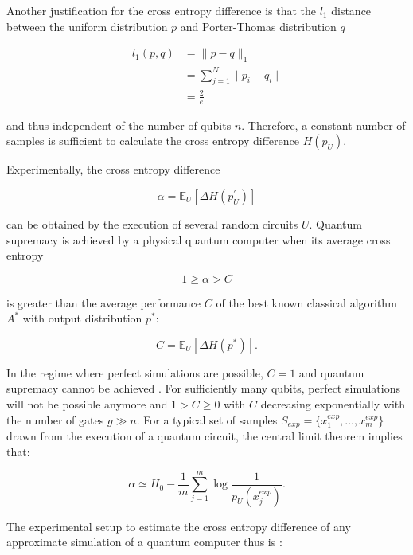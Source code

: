 Another justification for the cross entropy difference is that the $l_1$ distance between the uniform distribution $p$ and Porter-Thomas distribution $q$

\begin{align}
  l_1(p,q) &= \| p-q\|_1 \\
           &= \sum_{j=1}^N \mid p_i - q_i \mid \\
           &= \frac{2}{e}
\end{align}

and thus independent of the number of qubits $n$. Therefore, a
constant number of samples is sufficient to calculate the cross entropy difference $H(p_U)$.

Experimentally, the cross entropy difference

\begin{equation}
  \alpha = \mathbb{E}_U[\Delta H(p^{\prime}_U)]
\end{equation}

can be obtained by the execution of several random circuits $U$. Quantum
supremacy is achieved by a physical quantum computer when its average cross
entropy

\begin{equation}
  1 \geq \alpha > C
\end{equation}

is greater than the average performance $C$ of the best known classical algorithm $A^*$ with 
output distribution $p^*$:

\begin{equation}
  C = \mathbb{E}_U[\Delta H(p^*)] .
\end{equation}

In the regime where perfect simulations are possible, $C=1$ and quantum
supremacy cannot be achieved \cite{Boixo2018supremacy}. For sufficiently many qubits, perfect simulations
will not be possible anymore and $1 > C \geq 0$ with $C$ decreasing exponentially
with the number of gates $g\gg n$. For a typical set of samples $S_{exp} = \{x_1^{exp}, \dots , x_m^{exp}\}$ drawn from the
execution of a quantum circuit, the central limit theorem implies that:

\begin{equation}
  \label{eq:cef}
  \alpha \simeq H_0 - \frac{1}{m} \sum_{j = 1}^m \log{\frac{1}{p_U(x_j^{exp})}}.
\end{equation}

The experimental setup to estimate the cross entropy difference of any
approximate simulation of a quantum computer thus is \cite{Boixo2018supremacy}:

